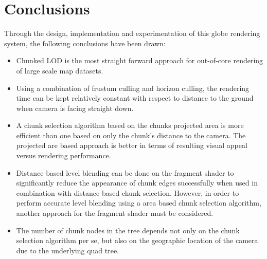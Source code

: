\chapter{Conclusions}
Through the design, implementation and experimentation of this globe rendering system, the following conclusions have been drawn:
\begin{itemize}
	\item Chunked LOD is the most straight forward approach for out-of-core rendering of large scale map datasets.
	\item Using a combination of frustum culling and horizon culling, the rendering time can be kept relatively constant with respect to distance to the ground when camera is facing straight down.
	\item A chunk selection algorithm based on the chunks projected area is more efficient than one based on only the chunk's distance to the camera. The projected are based approach is better in terms of resulting visual appeal versus rendering performance.
	\item Distance based level blending can be done on the fragment shader to significantly reduce the appearance of chunk edges successfully when used in combination with distance based chunk selection. However, in order to perform accurate level blending using a area based chunk selection algorithm, another approach for the fragment shader must be considered.
	\item The number of chunk nodes in the tree depends not only on the chunk selection algorithm per se, but also on the geographic location of the camera due to the underlying quad tree.

\end{itemize}